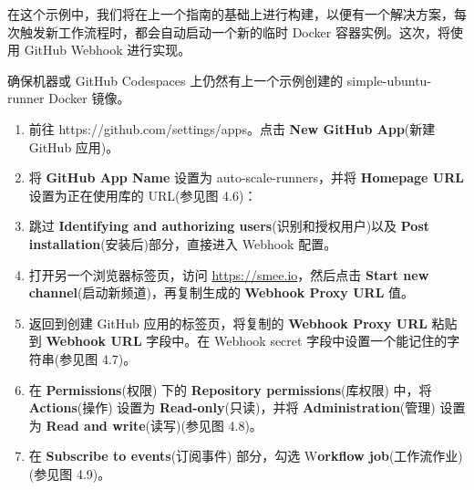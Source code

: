 在这个示例中，我们将在上一个指南的基础上进行构建，以便有一个解决方案，每次触发新工作流程时，都会自动启动一个新的临时 Docker 容器实例。这次，将使用 GitHub Webhook 进行实现。


确保机器或 GitHub Codespaces 上仍然有上一个示例创建的 simple-ubuntu-runner Docker 镜像。


\begin{enumerate}
\item 
前往 https://github.com/settings/apps。点击 \textbf{New GitHub App}(新建 GitHub 应用)。

\item 
将 \textbf{GitHub App Name} 设置为 auto-scale-runners，并将 \textbf{Homepage URL} 设置为正在使用库的 URL(参见图 4.6)：


\item 
跳过 \textbf{Identifying and authorizing users}(识别和授权用户)以及 \textbf{Post installation}(安装后)部分，直接进入 Webhook 配置。

\item 
打开另一个浏览器标签页，访问 \url{https://smee.io}，然后点击 \textbf{Start new channel}(启动新频道)，再复制生成的 \textbf{Webhook Proxy URL} 值。

\item 
返回到创建 GitHub 应用的标签页，将复制的 \textbf{Webhook Proxy URL} 粘贴到 \textbf{Webhook URL} 字段中。在 Webhook secret 字段中设置一个能记住的字符串(参见图 4.7)。


\item 
在 \textbf{Permissions}(权限) 下的 \textbf{Repository permissions}(库权限) 中，将 \textbf{Actions}(操作) 设置为 \textbf{Read-only}(只读)，并将 \textbf{Administration}(管理) 设置为 \textbf{Read and write}(读写)(参见图 4.8)。


\item 
在 \textbf{Subscribe to events}(订阅事件) 部分，勾选 W\textbf{orkflow job}(工作流作业)(参见图 4.9)。



\end{enumerate}
